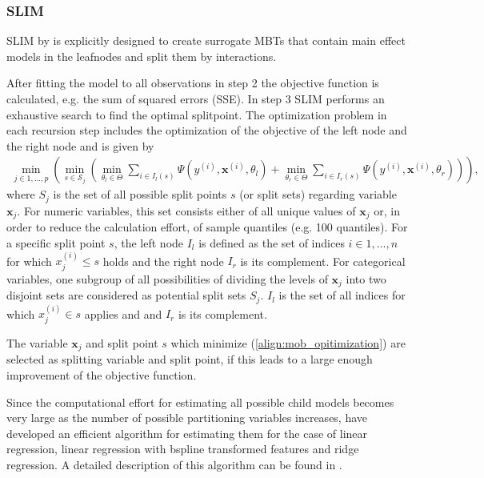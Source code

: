 \subsubsection{SLIM}
SLIM by \citep{Hu.2020} is explicitly designed to create surrogate MBTs that contain main effect models in the leafnodes and split them by interactions. 

After fitting the model to all observations in step 2 the  objective function is calculated, e.g. the sum of squared errors (SSE).
In step 3 SLIM performs an exhaustive search to find the optimal splitpoint.  
The optimization problem in each recursion step includes the optimization of the objective of the left node and the right node and is given by \begin{align} \label{align:mob_opitimization}
    \min_{j \in 1,..., p} \left( \min_{s \in \mathcal{S}_j} \left(\min_{\theta_{l} \in \Theta}\sum_{i \in I_{l}(s)}\Psi(y^{(i)}, \mathbf{x}^{(i)}, \theta_{l})  +  \min_{\theta_{r} \in \Theta}\sum_{i \in I_{r}(s)}\Psi(y^{(i)}, \mathbf{x}^{(i)}, \theta_{r}) \right) \right),
\end{align}
where ${S}_j$ is the set of all possible split points $s$ (or split sets) regarding variable $\mathbf{x}_j$. For numeric variables, this set consists either of all unique values of $\mathbf{x}_j$ or, in order to reduce the calculation effort, of sample quantiles (e.g. 100 quantiles). For a specific split point $s$, the left node $I_{l}$ is defined as the set of indices $i \in 1,...,n$ for which $x_j^{(i)} \leq s$ holds and the right node $I_{r}$ is its complement. For categorical variables, one subgroup of all possibilities of dividing the levels of $\mathbf{x}_j$ into two disjoint sets are considered as potential split sets $S_j$. $I_l$ is  the set of all indices for which $x_j^{(i)} \in s$ applies and and $I_{r}$ is its complement.

The variable $\mathbf{x}_j$ and split point $s$ which minimize  (\ref{align:mob_opitimization}) are selected as splitting variable and split point, if this leads to a large enough improvement of the objective function.

Since the computational effort for estimating all possible child models becomes very large as the number of possible partitioning variables increases, \citep{Hu.2020} have developed an efficient algorithm for estimating them for the case of linear regression, linear regression with bspline transformed features and ridge regression. A detailed description of this algorithm can be found in \citep{Hu.2020}.

